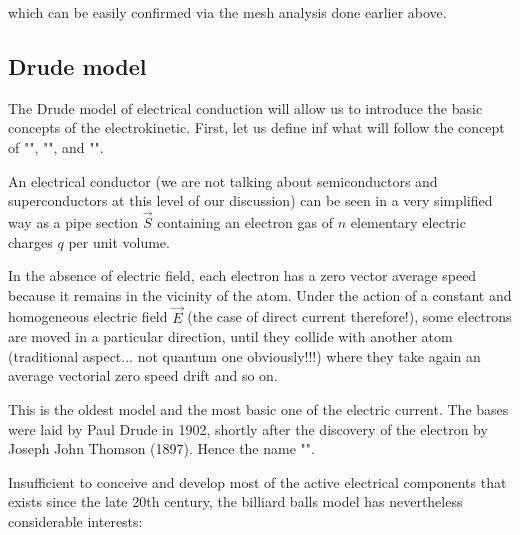     which can be easily confirmed via the mesh analysis done earlier above.
	
	\subsection{Drude model}
	The Drude model of electrical conduction will allow us to introduce the basic concepts of the electrokinetic. First, let us define inf what will follow the concept of "", "", and "".
	
	An electrical conductor (we are not talking about semiconductors and superconductors at this level of our discussion) can be seen in a very simplified way as a pipe section $\vec{S}$ containing an electron gas of $n$ elementary electric charges $q$ per unit volume.
	
	In the absence of electric field, each electron has a zero vector average speed because it remains in the vicinity of the atom. Under the action of a constant and homogeneous electric field $\vec{E}$ (the case of direct current therefore!), some electrons are moved in a particular direction, until they collide with another atom (traditional aspect... not quantum one obviously!!!) where they take again an average vectorial zero speed drift and so on.
	
	This is the oldest model and the most basic one of the electric current. The bases were laid by Paul Drude in 1902, shortly after the discovery of the electron by Joseph John Thomson (1897). Hence the name "".
	
	Insufficient to conceive and develop most of the active electrical components that exists since the late 20th century, the billiard balls model has nevertheless considerable interests:
	
